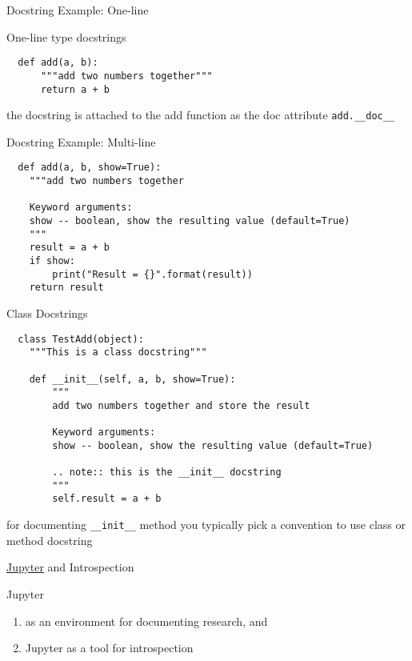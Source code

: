 \documentclass{beamer}
\begin{document}
\begin{frame}[fragile]{Docstring Example: One-line}

  One-line type docstrings

  \begin{verbatim}
  def add(a, b):
      """add two numbers together"""
      return a + b
  \end{verbatim}

the docstring is attached to the add function as the doc attribute \texttt{add.__doc__}

\end{frame}

\begin{frame}[fragile]{Docstring Example: Multi-line}

  \begin{verbatim}
  def add(a, b, show=True):
    """add two numbers together

    Keyword arguments:
    show -- boolean, show the resulting value (default=True)
    """
    result = a + b 
    if show: 
        print("Result = {}".format(result))
    return result
  \end{verbatim}

\end{frame}


\begin{frame}[fragile]{Class Docstrings}

  \begin{verbatim}
  class TestAdd(object):
    """This is a class docstring"""
    
    def __init__(self, a, b, show=True):
        """
        add two numbers together and store the result
    
        Keyword arguments:
        show -- boolean, show the resulting value (default=True)

        .. note:: this is the __init__ docstring
        """
        self.result = a + b
  \end{verbatim}

  for documenting \texttt{__init__} method you typically pick a convention to use class or method docstring

\end{frame}


\begin{frame}{\href{http://jupyter.org/}{Jupyter} and Introspection}

Jupyter

\begin{enumerate}
  \item as an environment for documenting research, and 
  \item Jupyter as a tool for introspection
\end{enumerate}

\end{frame}
\end{document}

